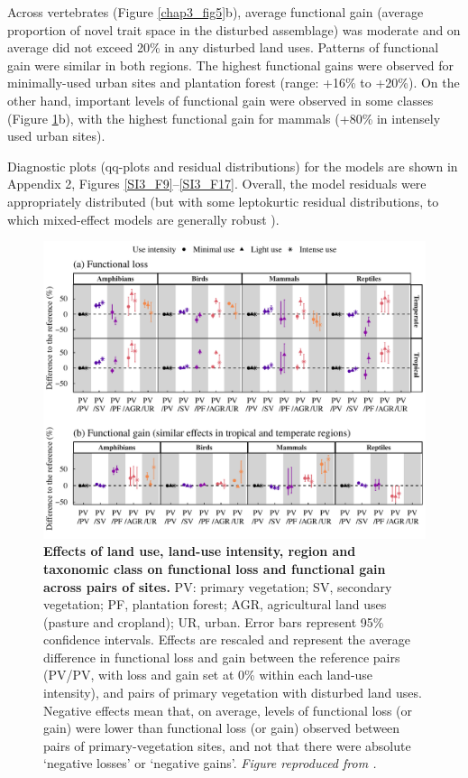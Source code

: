 Across vertebrates (Figure \ref{chap3_fig5}b), average functional gain (average proportion of novel trait space in the disturbed assemblage) was moderate and on average did not exceed 20\% in any disturbed land uses. Patterns of functional gain were similar in both regions. The highest functional gains were observed for minimally-used urban sites and plantation forest (range: +16\% to +20\%). On the other hand, important levels of functional gain were observed in some classes (Figure \ref{chap3_fig6}b), with the highest functional gain for mammals (+80\% in intensely used urban sites).

Diagnostic plots (qq-plots and residual distributions) for the models are shown in Appendix 2, Figures \ref{SI3_F9}–\ref{SI3_F17}. Overall, the model residuals were appropriately distributed (but with some leptokurtic residual distributions, to which mixed-effect models are generally robust \citep{Schielzeth2020}).

\begin{figure}[h!]
\centering
\includegraphics[scale=0.75]{figures/Chapter_FD/Figure6}
\caption[Effects of land use, land-use intensity, region and taxonomic class on functional loss and functional gain across pairs of sites.]{\textbf{Effects of land use, land-use intensity, region and taxonomic class on functional loss and functional gain across pairs of sites.}  PV: primary vegetation; SV, secondary vegetation; PF, plantation forest; AGR, agricultural land uses (pasture and cropland); UR, urban. Error bars represent 95\% confidence intervals. Effects are rescaled and represent the average difference in functional loss and gain between the reference pairs (PV/PV, with loss and gain set at 0\% within each land-use intensity), and pairs of primary vegetation with disturbed land uses. Negative effects mean that, on average, levels of functional loss (or gain) were lower than functional loss (or gain) observed between pairs of primary-vegetation sites, and not that there were absolute `negative losses' or `negative gains'. \textit{Figure reproduced from \citet{Etard2021}.}}
\label{chap3_fig6}
\end{figure}

